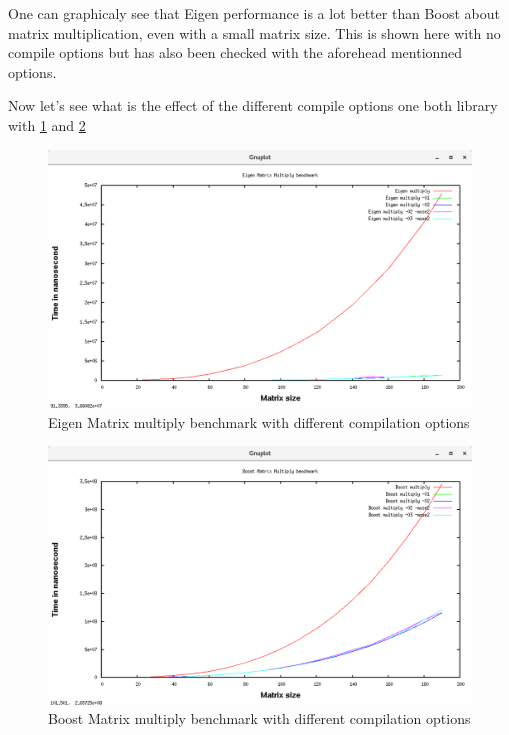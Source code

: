     One can graphicaly see that Eigen performance is a lot better than Boost about matrix multiplication, even with a small matrix size. This is shown here with no compile options but has also been checked with the aforehead mentionned options.
    
    \newpage
    Now let's see what is the effect of the different compile options one both library with \ref{Eigen Matrix multiply benchmark} and \ref{Boost Matrix multiply benchmark}
  \begin{figure}[h]
    \includegraphics[width=442px]{benchmark_eigen_compilation_option.png}
    \caption{Eigen Matrix multiply benchmark with different compilation options}
    \label{Eigen Matrix multiply benchmark}
  \end{figure}
  
  \begin{figure}[h!]
    \includegraphics[width=442px]{benchmark_Boost_compilation_option.png}
    \caption{Boost Matrix multiply benchmark with different compilation options}
    \label{Boost Matrix multiply benchmark}
  \end{figure}
  
  
  
